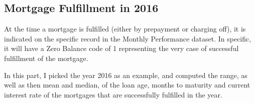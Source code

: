 \documentclass[11pt]{article}
\begin{document}
    \hypertarget{mortgage-fulfillment-in-2016}{%
\subsection{Mortgage Fulfillment in
2016}\label{mortgage-fulfillment-in-2016}}

At the time a mortgage is fulfilled (either by prepayment or charging
off), it is indicated on the specific record in the Monthly Performance
dataset. In specific, it will have a Zero Balance code of 1 representing
the very case of successful fulfillment of the mortgage.

In this part, I picked the year 2016 as an example, and computed the
range, as well as then mean and median, of the loan age, months to
maturity and current interest rate of the mortgages that are
successfully fulfilled in the year.
\end{document}
